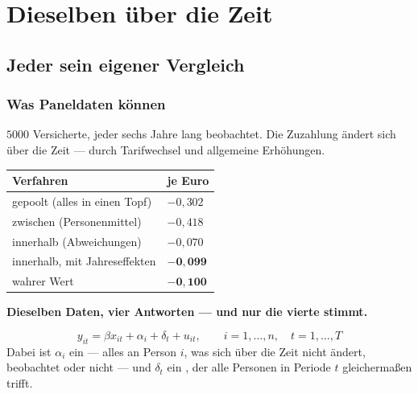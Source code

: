 \part{Dieselben über die Zeit}

\chapter{Jeder sein eigener Vergleich}

\section{Was Paneldaten können}

\begin{merksatz}
$5000$ Versicherte, jeder sechs Jahre lang beobachtet. Die Zuzahlung ändert sich über die Zeit --- durch Tarifwechsel und allgemeine Erhöhungen.

\begin{center}
{\small
\renewcommand{\arraystretch}{1.48}
\begin{tabular}{@{}P{3.6cm}P{2.6cm}@{}}
\toprule
\textbf{Verfahren} & \textbf{je Euro}\\
\midrule
gepoolt (alles in einen Topf) & $-0{,}302$\\
zwischen (Personenmittel) & $-0{,}418$\\
innerhalb (Abweichungen) & $-0{,}070$\\
innerhalb, mit Jahreseffekten & $\mathbf{-0{,}099}$\\
\midrule
wahrer Wert & $\mathbf{-0{,}100}$\\
\bottomrule
\end{tabular}}
\end{center}

\begin{center}
\begin{minipage}{0.9\textwidth}
\textbf{Dieselben Daten, vier Antworten --- und nur die vierte stimmt.}
\end{minipage}
\end{center}
\end{merksatz}

\begin{definition}
\[ y_{it} = \beta x_{it} + \alpha_i + \delta_t + u_{it}, \qquad i = 1,\ldots,n,\quad t = 1,\ldots,T \]
Dabei ist $\alpha_i$ ein  --- alles an Person $i$, was sich über die Zeit nicht ändert, beobachtet oder nicht --- und $\delta_t$ ein , der alle Personen in Periode $t$ gleichermaßen trifft.
\end{definition}

